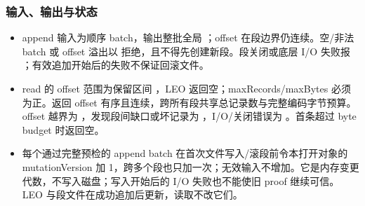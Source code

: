 \subsubsection*{输入、输出与状态}
\begin{itemize}
\item append 输入为顺序 batch，输出整批全局 \pathcode{[firstOffset,nextOffset)}；offset 在段边界仍连续。空/非法 batch 或 offset 溢出以  拒绝，且不得先创建新段。段关闭或底层 I/O 失败报 ；有效追加开始后的失败不保证回滚文件。
\item read 的 offset 范围为保留区间 ，LEO 返回空；maxRecords/maxBytes 必须为正。返回 offset 有序且连续，跨所有段共享总记录数与完整编码字节预算。offset 越界为 ，发现段间缺口或坏记录为 ，I/O/关闭错误为 。首条超过 byte budget 时返回空。
\item 每个通过完整预检的 append batch 在首次文件写入/滚段前令本打开对象的 mutationVersion 加 1，跨多个段也只加一次；无效输入不增加。它是内存变更代数，不写入磁盘；写入开始后的 I/O 失败也不能使旧 proof 继续可信。LEO 与段文件在成功追加后更新，读取不改它们。
\end{itemize}
